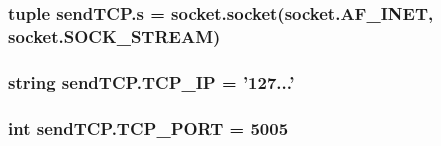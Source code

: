 \subsubsection[{s}]{\setlength{\rightskip}{0pt plus 5cm}tuple send\+T\+C\+P.\+s = socket.\+socket(socket.\+A\+F\+\_\+\+I\+N\+E\+T, socket.\+S\+O\+C\+K\+\_\+\+S\+T\+R\+E\+A\+M)}\label{namespacesendTCP_aac7d36265acf097cb58b7f7fbe733135}
\hypertarget{namespacesendTCP_a4c20a021b7b8335700a990879a244f5a}{}
\subsubsection[{T\+C\+P\+\_\+\+I\+P}]{\setlength{\rightskip}{0pt plus 5cm}string send\+T\+C\+P.\+T\+C\+P\+\_\+\+I\+P = '127...'}\label{namespacesendTCP_a4c20a021b7b8335700a990879a244f5a}
\hypertarget{namespacesendTCP_a85e52e04bea6e2e3f50a576d03da6f6a}{}
\subsubsection[{T\+C\+P\+\_\+\+P\+O\+R\+T}]{\setlength{\rightskip}{0pt plus 5cm}int send\+T\+C\+P.\+T\+C\+P\+\_\+\+P\+O\+R\+T = 5005}\label{namespacesendTCP_a85e52e04bea6e2e3f50a576d03da6f6a}
